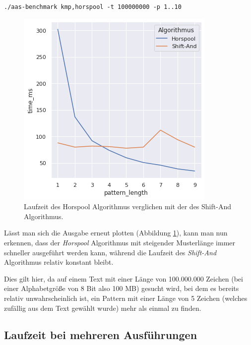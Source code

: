 \documentclass[twocolumn]{article}
\begin{document}
\begin{lstlisting}[breaklines=true,autogobble=true]
    ./aas-benchmark kmp,horspool -t 100000000 -p 1..10
\end{lstlisting}

\begin{figure}
    \includegraphics[width=\linewidth]{assets/graph_2.png}
    \caption{Laufzeit des Horspool Algorithmus verglichen mit der des Shift-And Algorithmus.}
    \label{fig:runtime_horspool_shift_and}
\end{figure}

Lässt man sich die Ausgabe erneut plotten (Abbildung \ref{fig:runtime_horspool_shift_and}), kann man nun erkennen, dass der \textit{Horspool} Algorithmus mit steigender Musterlänge immer schneller ausgeführt werden kann, während die Laufzeit des \textit{Shift-And} Algorithmus relativ konstant bleibt.

Dies gilt hier, da auf einem Text mit einer Länge von 100.000.000 Zeichen (bei einer Alphabetgröße von 8 Bit also 100 MB) gesucht wird, bei dem es bereits relativ unwahrscheinlich ist, ein Pattern mit einer Länge von 5 Zeichen (welches zufällig aus dem Text gewählt wurde) mehr als einmal zu finden.

\subsection*{Laufzeit bei mehreren Ausführungen}
\end{document}
